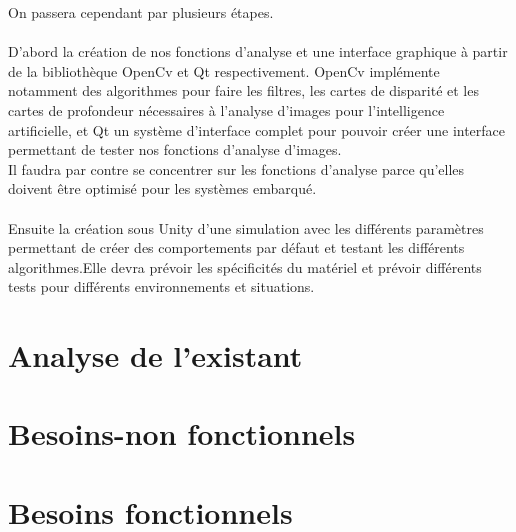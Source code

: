 \documentclass{article}
\begin{document}
	On passera cependant par plusieurs étapes.
	\\\\
	D'abord la création de nos fonctions d'analyse et une interface graphique à partir de la bibliothèque OpenCv et Qt respectivement. OpenCv implémente notamment des algorithmes pour faire les filtres, les cartes de disparité et les cartes de profondeur nécessaires à l'analyse d'images pour l'intelligence artificielle, et Qt un système d'interface complet pour pouvoir créer une interface permettant de tester nos fonctions d'analyse d'images.\\
Il faudra par contre se concentrer sur les fonctions d'analyse parce qu’elles doivent être optimisé pour les systèmes embarqué.
\\\\
	Ensuite la création sous Unity  d'une simulation avec les différents paramètres permettant de créer des comportements par défaut et testant les différents algorithmes.Elle devra prévoir les spécificités du matériel et prévoir différents tests pour différents environnements et situations.\\
	

\newpage
\section{Analyse de l’existant}


\newpage
\section{Besoins-non fonctionnels}


\newpage
\section{Besoins fonctionnels}
\end{document}
